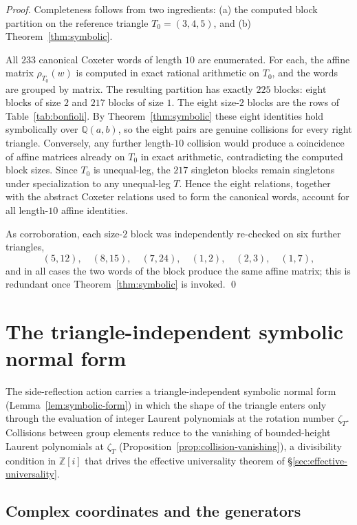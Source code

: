 \documentclass[11pt]{article}
\theoremstyle{plain}
\theoremstyle{definition}
\theoremstyle{remark}
\begin{document}
\begin{proof}
Completeness follows from two ingredients: (a) the computed block partition on
the reference triangle $T_0 = (3,4,5)$, and (b) Theorem~\ref{thm:symbolic}.

All $233$ canonical Coxeter words of length $10$ are enumerated. For each, the
affine matrix $\rho_{T_0}(w)$ is computed in exact rational arithmetic on $T_0$,
and the words are grouped by matrix. The resulting partition has exactly $225$
blocks: eight blocks of size $2$ and $217$ blocks of size $1$. The eight
size-$2$ blocks are the rows of Table~\ref{tab:bonfioli}. By
Theorem~\ref{thm:symbolic} these eight identities hold symbolically over
$\mathbb{Q}(a,b)$, so the eight pairs are genuine collisions for every right
triangle. Conversely, any further length-$10$ collision would produce a
coincidence of affine matrices already on $T_0$ in exact arithmetic,
contradicting the computed block sizes. Since $T_0$ is unequal-leg, the $217$
singleton blocks remain singletons under specialization to any unequal-leg $T$.
Hence the eight relations, together with the abstract Coxeter relations used to
form the canonical words, account for all length-$10$ affine identities.

As corroboration, each size-$2$ block was independently re-checked on six
further triangles,
\[
(5,12),\quad (8,15),\quad (7,24),\quad (1,2),\quad (2,3),\quad (1,7),
\]
and in all cases the two words of the block produce the same affine matrix; this
is redundant once Theorem~\ref{thm:symbolic} is invoked.
\qed
\end{proof}

\section{The triangle-independent symbolic normal form}
\label{sec:symbolic-normal-form}

The side-reflection action carries a triangle-independent symbolic normal
form (Lemma~\ref{lem:symbolic-form}) in which the shape of the triangle
enters only through the evaluation of integer Laurent polynomials at the
rotation number $\zeta_T$. Collisions between group elements reduce to the
vanishing of bounded-height Laurent polynomials at $\zeta_T$
(Proposition~\ref{prop:collision-vanishing}), a divisibility condition in
$\mathbb{Z}[i]$ that drives the effective universality theorem of
\S\ref{sec:effective-universality}.

\subsection{Complex coordinates and the generators}
\end{document}
